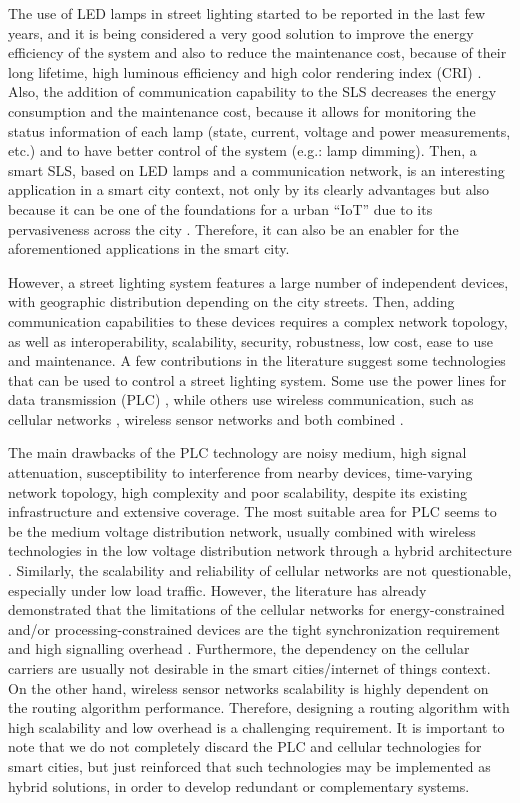 \documentclass[final,authoryear,3p,twocolumn]{elsarticle}
\begin{document}
The use of LED lamps in street lighting started to be reported in the last few years, and it is being considered a very good solution to improve the energy efficiency of the system and also to reduce the maintenance cost, because of their long lifetime, high luminous efficiency and high color rendering index (CRI) \citep{CRI_2010}. Also, the addition of communication capability to the SLS decreases the energy consumption and the maintenance cost, because it allows for monitoring the status information of each lamp (state, current, voltage and power measurements, etc.) and to have better control of the system (e.g.: lamp dimming). Then, a smart SLS, based on LED lamps and a communication network, is an interesting application in a smart city context, not only by its clearly advantages but also because it can be one of the foundations for a urban ``IoT'' due to its pervasiveness across the city \citep{Smart_City_Smart_Light_2013}. Therefore, it can also be an enabler for the aforementioned applications in the smart city.

However, a street lighting system features a large number of independent devices, with geographic distribution depending on the city streets. Then, adding communication capabilities to these devices requires a complex network topology, as well as interoperability, scalability, security, robustness, low cost, ease to use and maintenance. A few contributions in the literature suggest some technologies that can be used to control a street lighting system. Some use the power lines for data transmission (PLC) \citep{PLC_Street_Lighting_2006}, while others use wireless communication, such as cellular networks \citep{Cellular_Street_Lighting_2010_1}, wireless sensor networks \citep{WSN_Street_Lighting_2010_1} and both combined \citep{WSN_Street_lighting_2007}.

The main drawbacks of the PLC technology are noisy medium, high signal attenuation, susceptibility to interference from nearby devices, time-varying network topology, high complexity and poor scalability, despite its existing infrastructure and extensive coverage. The most suitable area for PLC seems to be the medium voltage distribution network, usually combined with wireless technologies in the low voltage distribution network through a hybrid architecture \citep{PLC_drawbacks}. Similarly, the scalability and reliability of cellular networks are not questionable, especially under low load traffic. However, the literature has already demonstrated that the limitations of the cellular networks for energy-constrained and/or processing-constrained devices are the tight synchronization requirement and high signalling overhead \citep{celullar_iot}. Furthermore, the dependency on the cellular carriers are usually not desirable in the smart cities/internet of things context. On the other hand, wireless sensor networks scalability is highly dependent on the routing algorithm performance. Therefore, designing a routing algorithm with high scalability and low overhead is a challenging requirement. It is important to note that we do not completely discard the PLC and cellular technologies for smart cities, but just reinforced that such technologies may be implemented as hybrid solutions, in order to develop redundant or complementary systems.
\end{document}
